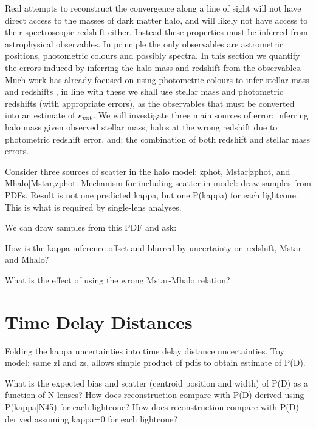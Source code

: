 \documentclass[useAMS,usenatbib]{mn2e}
\begin{document}
Real attempts to reconstruct the convergence along a line of sight will not have direct access to the masses of dark matter halo, 
and will likely not have access to their spectroscopic redshift either. Instead these properties must be inferred from astrophysical
observables. In principle the only observables are astrometric positions, photometric colours and possibly spectra. In this section we
quantify the errors induced by inferring the halo mass and redshift from the observables. Much work has already focused on using
photometric colours to infer stellar mass \citep[\eg][]{augerstellarpops} and redshifts \citep[\eg][]{BPZ}, in line with these we shall use
stellar mass and photometric redshifts (with appropriate errors), as the observables that must be converted into an estimate
of $\kappa_{\rm ext}$. We will investigate three main sources of error: inferring halo mass given observed stellar mass; halos at the wrong redshift
due to photometric redshift error, and; the combination of both redshift and stellar mass errors.


Consider three sources of scatter in the halo model: zphot, Mstar|zphot, and
Mhalo|Mstar,zphot. Mechanism for including scatter in model: draw samples from
PDFs. Result is not one predicted kappa, but one P(kappa) for each lightcone.
This is what is required by single-lens analyses. 

We can draw samples from this PDF and ask:

How is the kappa inference offset and blurred by uncertainty on redshift, Mstar
and Mhalo? 

What is the effect of using the wrong Mstar-Mhalo relation? 









\section{Time Delay Distances}
\label{sec:Dt} 

Folding the kappa uncertainties into time delay distance uncertainties. Toy
model: same zl and zs, allows simple product of pdfs to obtain estimate of P(D).

What is the expected bias and scatter (centroid position and width) of P(D) as a
function of N lenses? How does reconstruction compare with P(D) derived using
P(kappa|N45) for each lightcone? How does reconstruction compare with P(D)
derived assuming kappa=0 for each lightcone?
\end{document}
